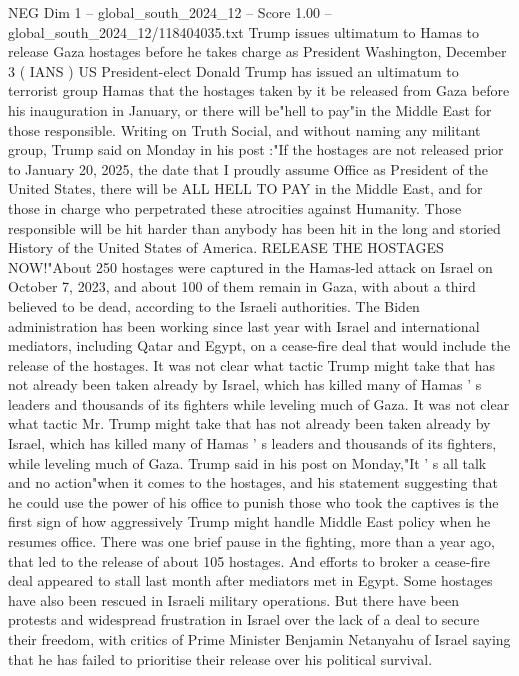 \begin{textsample}{NEG Dim 1 – global\_south\_2024\_12 – Score 1.00 – global\_south\_2024\_12/118404035.txt}  \label{ex:f1_neg_260}
Trump issues ultimatum to Hamas to release Gaza hostages before he takes charge as President Washington, December 3 ( IANS ) US President-elect Donald Trump has issued an ultimatum to terrorist group Hamas that the hostages taken by it be released from Gaza before his inauguration in January, or there will be"hell to pay"in the Middle East for those responsible.
Writing on Truth Social, and without naming any militant group, Trump said on Monday in his post :"If the hostages are not released prior to January 20, 2025, the date that I proudly assume Office as President of the United States, there will be ALL HELL TO PAY in the Middle East, and for those in charge who perpetrated these atrocities against Humanity.
Those responsible will be hit harder than anybody has been hit in the long and storied History of the United States of America.
RELEASE THE HOSTAGES NOW!"About 250 hostages were captured in the Hamas-led attack on Israel on October 7, 2023, and about 100 of them remain in Gaza, with about a third believed to be dead, according to the Israeli authorities.
The Biden administration has been working since last year with Israel and international mediators, including Qatar and Egypt, on a cease-fire deal that would include the release of the hostages.
It was not clear what tactic Trump might take that has not already been taken already by Israel, which has killed many of Hamas ' s leaders and thousands of its fighters while leveling much of Gaza.
It was not clear what tactic Mr.
Trump might take that has not already been taken already by Israel, which has killed many of Hamas ' s leaders and thousands of its fighters, while leveling much of Gaza.
Trump said in his post on Monday,"It ' s all talk and no action"when it comes to the hostages, and his statement suggesting that he could use the power of his office to punish those who took the captives is the first sign of how aggressively Trump might handle Middle East policy when he resumes office.
There was one brief pause in the fighting, more than a year ago, that led to the release of about 105 hostages.
And efforts to broker a cease-fire deal appeared to stall last month after mediators met in Egypt.
Some hostages have also been rescued in Israeli military operations.
But there have been protests and widespread frustration in Israel over the lack of a deal to secure their freedom, with critics of Prime Minister Benjamin Netanyahu of Israel saying that he has failed to prioritise their release over his political survival.

\end{textsample}
